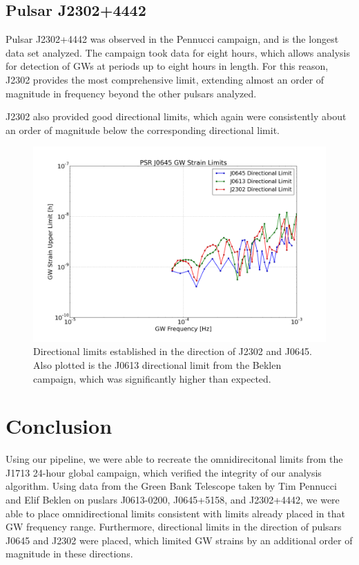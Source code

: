 \documentclass[12pt]{article}
\begin{document}
\subsection{Pulsar J2302+4442}

Pulsar J2302+4442 was observed in the Pennucci campaign, and is the longest data
set analyzed. The campaign took data for eight hours, which allows analysis for
detection of GWs at periods up to eight hours in length. For this reason, J2302
provides the most comprehensive limit, extending almost an order of magnitude in
frequency beyond the other pulsars analyzed.

J2302 also provided good directional limits, which again were consistently about
an order of magnitude below the corresponding directional limit.

\begin{figure}
    \caption{Directional limits established in the direction of J2302 and J0645.
    Also plotted is the J0613 directional limit from the Beklen campaign, which was significantly higher
    than expected.}
    \includegraphics[width=1\textwidth]{./figures/all_directional.png}
\end{figure}

\section{Conclusion}
    Using our pipeline, we were able to recreate the omnidirecitonal limits from the J1713 24-hour global campaign, which verified the
integrity of our analysis algorithm. Using data from the Green Bank Telescope
taken by Tim Pennucci and Elif Beklen on puslars J0613-0200, J0645+5158, and
J2302+4442, we
were able to place omnidirectional limits consistent with limits already placed
in that GW frequency range. 
    Furthermore, directional limits in the direction of pulsars J0645 and J2302
    were placed, which limited GW strains by an additional order of magnitude in
    these directions.
\end{document}
